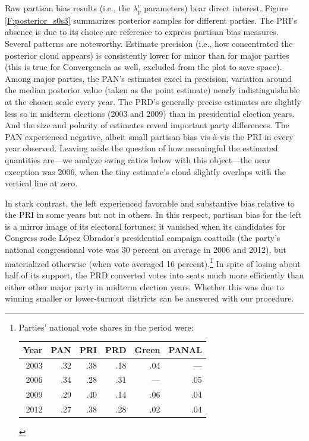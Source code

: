 \documentclass[letter,12pt]{article}
\begin{document}
Raw partisan bias results (i.e., the $\lambda_p^v$ parameters) bear direct interest. Figure \ref{F:posterior_s0s3} summarizes posterior samples for different parties. The PRI's absence is due to its choice are reference to express partisan bias measures. Several patterns are noteworthy. Estimate precision (i.e., how concentrated the posterior cloud appears) is consistently lower for minor than for major parties (this is true for Convergencia as well, excluded from the plot to save space). Among major parties, the PAN's estimates excel in precision, variation around the median posterior value (taken as the point estimate) nearly indistinguishable at the chosen scale every year. The PRD's generally precise estimates are slightly less so in midterm elections (2003 and 2009) than in presidential election years. And the size and polarity of estimates reveal important party differences. The PAN experienced negative, albeit small partisan bias vis-\`a-vis the PRI in every year observed. Leaving aside the question of how meaningful the estimated quantities are---we analyze swing ratios below with this object---the near exception was 2006, when the tiny estimate's cloud slightly overlaps with the vertical line at zero. 

In stark contrast, the left experienced favorable and substantive bias relative to the PRI in some years but not in others. In this respect, partisan bias for the left is a mirror image of its electoral fortunes: it vanished when its candidates for Congress rode L\'opez Obrador's presidential campaign coattails (the party's national congressional vote was 30 percent on average in 2006 and 2012), but materialized otherwise (when vote averaged 16 percent).\footnote{Parties' national vote shares in the period were: \begin{tabular}{rrrrrr} Year & PAN & PRI & PRD & Green & PANAL \\ \hline 2003 & .32 & .38 & .18 & .04 & --- \\ 2006 & .34 & .28 & .31 & --- & .05 \\ 2009 & .29 & .40 & .14 & .06 & .04 \\ 2012 & .27 & .38 & .28 & .02 & .04 \\ \end{tabular}} In spite of losing about half of its support, the PRD converted votes into seats much more efficiently than either other major party in midterm election years. Whether this was due to winning smaller or lower-turnout districts can be answered with our procedure.
\end{document}
